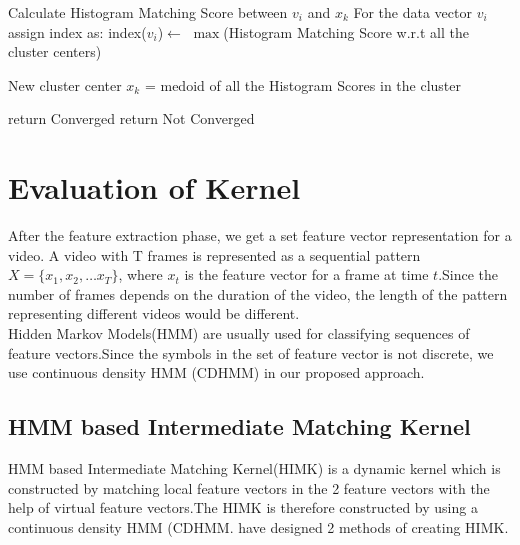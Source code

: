 \begin{enumerate}
\begin{algorithm}[H]
\begin{algorithmic}
\end{algorithmic}
\end{algorithm}


\begin{algorithm}[H]
\caption{Histogram Matching Score based -  K-medoid algorithm}
\label{Kmedoid}
\begin{algorithmic}[1]
    		\State Calculate Histogram Matching Score between $v_{i}$ and $x_{k}$
		\EndFor
		\State For the data vector $v_{i}$ assign index as:
		\State index($v_{i}$)$\gets$ $\max$(Histogram Matching Score w.r.t all the cluster centers)
    \EndFor
    
 		\State New cluster center $x_{k}$ = medoid of all the Histogram Scores in the cluster
 	\EndFor
 	
 			\State return Converged
 		\Else
 			\State return Not Converged
 		\EndIf
 	\EndFor
 \EndWhile		

\end{algorithmic}
\end{algorithm}

\end{enumerate}

\section{Evaluation of Kernel}
After the feature extraction phase, we get a set feature vector representation for a video. A video with T frames is represented as a sequential pattern $X=\lbrace x_1,x_2, \ldots x_T\rbrace$, where $x_t$ is the feature vector for a frame at time $t$.Since the number of frames depends on the duration of the video, the length of the pattern representing different videos would be different.\\
Hidden Markov Models(HMM) are usually used for classifying sequences of feature vectors.Since the symbols in the set of feature vector is not discrete, we use continuous density HMM (CDHMM) in our proposed approach.

\subsection{HMM based Intermediate Matching Kernel}
HMM based Intermediate Matching Kernel(HIMK) is a dynamic kernel which is constructed by matching local feature vectors in the 2 feature vectors with the help of virtual feature vectors.The HIMK is therefore constructed by using a continuous density HMM (CDHMM. \citet{HIMK} have designed 2 methods of creating HIMK.\\

